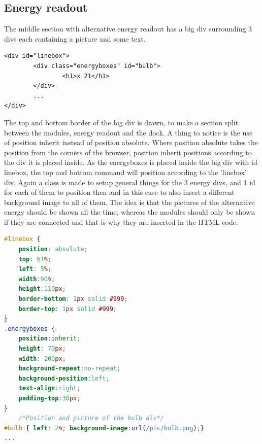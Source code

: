 \subsection{Energy readout}
The middle section with alternative energy readout has a big div surrounding 3 divs each containing a picture and some text.
\begin{lstlisting}
<div id="linebox">
		<div class="energyboxes" id="bulb">
				<h1>x 21</h1>
		</div>
		...
</div>
\end{lstlisting}
The top and bottom border of the big div is drawn, to make a section split between the modules, energy readout and the dock. A thing to notice is the use of position inherit instead of position absolute. Where position absolute takes the position from the corners of the browser, position inherit positions according to the div it is placed inside. As the energyboxes is placed inside the big div with id linebox, the top and bottom command will position according to the 'linebox' div. Again a class is made to setup general things for the 3 energy divs, and 1 id for each of them to position then and in this case to also insert a different background image to all of them. The idea is that the pictures of the alternative energy should be shown all the time, whereas the modules should only be shown if they are connected and that is why they are inserted in the HTML code.
\begin{lstlisting}[language=CSS]
#linebox {
	position: absolute;
	top: 61%;
	left: 5%;
	width:90%;
	height:110px;
	border-bottom: 1px solid #999;
	border-top: 1px solid #999;
}
.energyboxes {
	position:inherit;
	height: 70px;
	width: 200px;
	background-repeat:no-repeat;
	background-position:left;
	text-align:right;
	padding-top:30px;
}
	/*Position and picture of the bulb div*/
#bulb { left: 2%; background-image:url(/pic/bulb.png);}
...
\end{lstlisting}


